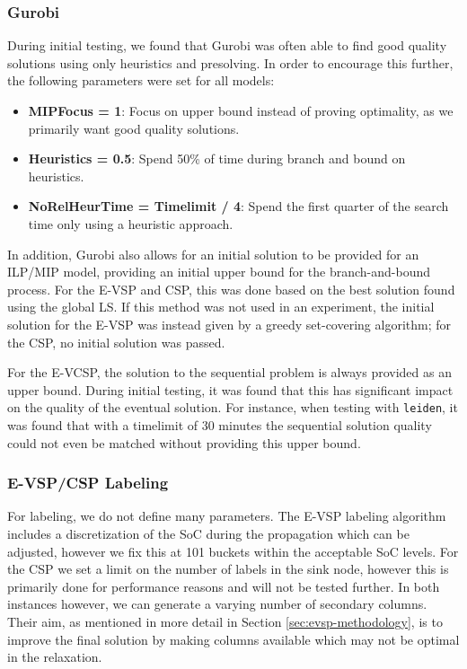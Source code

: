 \documentclass[]{article}
\begin{document}
\subsubsection{Gurobi}
During initial testing, we found that Gurobi was often able to find good quality solutions using only heuristics and presolving. In order to encourage this further, the following parameters were set for all models: 
\begin{itemize}
  \item \textbf{MIPFocus = 1}: Focus on upper bound instead of proving optimality, as we primarily want good quality solutions. 
  \item \textbf{Heuristics = 0.5}: Spend 50\% of time during branch and bound on heuristics. 
  \item \textbf{NoRelHeurTime = Timelimit / 4}: Spend the first quarter of the search time only using a heuristic approach. 
\end{itemize} 

\noindent In addition, Gurobi also allows for an initial solution to be provided for an ILP/MIP model, providing an initial upper bound for the branch-and-bound process. For the E-VSP and CSP, this was done based on the best solution found using the global LS. If this method was not used in an experiment, the initial solution for the E-VSP was instead given by a greedy set-covering algorithm; for the CSP, no initial solution was passed. 

For the E-VCSP, the solution to the sequential problem is always provided as an upper bound. During initial testing, it was found that this has significant impact on the quality of the eventual solution. For instance, when testing with \texttt{leiden}, it was found that with a timelimit of 30 minutes the sequential solution quality could not even be matched without providing this upper bound.

\subsubsection{E-VSP/CSP Labeling} \label{sec:params-sec-label-columns}
For labeling, we do not define many parameters. The E-VSP labeling algorithm includes a discretization of the SoC during the propagation which can be adjusted, however we fix this at 101 buckets within the acceptable SoC levels. For the CSP we set a limit on the number of labels in the sink node, however this is primarily done for performance reasons and will not be tested further. In both instances however, we can generate a varying number of secondary columns. Their aim, as mentioned in more detail in Section \ref{sec:evsp-methodology}, is to improve the final solution by making columns available which may not be optimal in the relaxation. 
\end{document}
